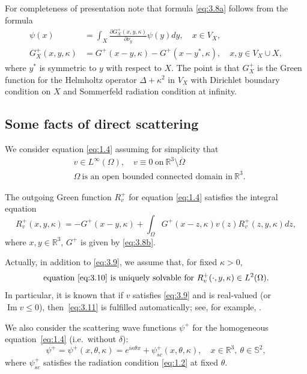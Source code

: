 \documentclass[10pt,a4paper]{amsart}
\newcommand{\ie}{i.e.\ }
\newcommand{\RR}{\mathbb R}
\renewcommand{\Im}{\mathop{\mathrm{Im}}}
\theoremstyle{definition}
\begin{document}
For completeness of presentation note that formula \eqref{eq:3.8a} follows from the formula
\begin{equation}\label{eq:3.9a}
\begin{aligned}
\psi(x)&= \int_{X}\frac{\partial G^+_X(x,y,\kappa)}{\partial \nu_{y}}\psi(y)dy,\quad x\in V_X,\\
G^+_X(x,y,\kappa)&= G^+(x-y,\kappa)-G^+(x-y^*,\kappa),\quad x,y\in V_X \cup X,
\end{aligned}
\end{equation}
where $y^*$ is symmetric to $y$ with respect to $X$.
The point is that $G^+_X$ is the Green function for the Helmholtz operator $\Delta+\kappa^2$ in $V_X$
with Dirichlet boundary condition on $X$ and Sommerfeld radiation condition at infinity.

\subsection{Some facts of direct scattering}\label{subsec:3.4}

We consider equation \eqref{eq:1.4} assuming for simplicity that
\begin{equation}\label{eq:3.9}
\begin{aligned}
&v \in L^{\infty}(\Omega),\quad v \equiv 0\ \mbox{on}\ \RR^3\setminus \overline {\Omega}\\
&\Omega\ \mbox{is\ an\ open\ bounded\ connected\ domain\ in}\ \RR^3.
\end{aligned}
\end{equation}

The outgoing Green function $R_v^+$ for equation \eqref{eq:1.4} satisfies the integral equation
\begin{equation}
\label{eq:3.10}
R_v^+(x, y, \kappa)=-G^+(x-y,\kappa) +\int_{\Omega}G^+(x-z,\kappa)v(z)R_v^+(z, y, \kappa)dz,
\end{equation}
where $x,y \in \RR^3$, $G^+$ is given by \eqref{eq:3.8b}.

Actually, in addition to \eqref{eq:3.9}, we assume that, for fixed $\kappa>0$,
\begin{equation}
\label{eq:3.11}
\mbox{equation}\ \eqref{eq:3.10}\ \mbox{is\ uniquely\ solvable\ for}\ R_v^+(\cdot , y, \kappa) \in L^2(\Omega).
\end{equation}
In particular, it is known that if $v$ satisfies \eqref{eq:3.9} and is real-valued (or $\Im v \leq 0$), then~\eqref{eq:3.11} is fulfilled automatically;
see, for example, \cite{CK}.

We also consider the scattering wave functions $\psi^+$ for the homogeneous equation~\eqref{eq:1.4} (\ie without $\delta$):
\begin{equation}
\label{eq:3.12}
\psi^+=\psi^+(x,\theta,\kappa)=e^{i \kappa\theta x}+\psi^+_{sc}(x,\theta,\kappa),\quad x \in \RR^3,\ \theta \in \mathbb S^2,
\end{equation}
where $\psi^+_{sc}$ satisfies the radiation condition \eqref{eq:1.2} at fixed $\theta$.
\end{document}
